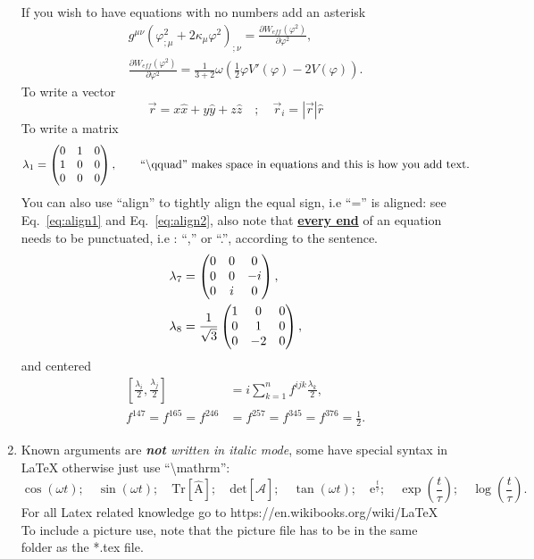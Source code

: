 \documentclass[11pt,fleqn]{article}
\newcommand{\eexp}{\mbox{e}^}
\newcommand{\amatrix}[1]{\begin{matrix} #1 \end{matrix}}
\begin{document}
\begin{enumerate}
If you wish to have equations with no numbers add an asterisk
\begin{eqnarray*}
&& g^{\mu \nu} \left( \varphi^2_{;\mu} + 2 \kappa_\mu \varphi^2\right)_{;\nu} = \frac{\partial W_{eff}(\varphi^2)}{\partial \varphi^2}, \\
&& \frac{\partial W_{eff}(\varphi^2)}{\partial \varphi^2} = \frac{1}{3+ 2} \omega \left(\frac{1}{2} \varphi V'(\varphi) - 2V(\varphi)\right).
\end{eqnarray*}
To write a vector
\begin{equation}
\vec{r} = x \hat{x} + y \hat{y} + z\hat{z} \quad ; \quad \vec{r}_i
= \left|\vec{r}\right|\hat{r} \end{equation}
To write a matrix
\begin{equation}
\lambda_1 
= \left( \amatrix { 0 & 1 & 0 \cr 1 & 0 & 0 \cr 0 & 0 & 0}\right), \text{\qquad ``\textbackslash qquad'' makes space in equations and this is how you add text.}
\end{equation}
You can also use ``align'' to tightly align the equal sign, i.e ``='' is aligned: see Eq.~\eqref{eq:align1} and Eq.~\eqref{eq:align2},  also note that {\underline{\bf every end}} of an  equation needs to be punctuated, i.e : ``,'' or ``.'', according to the sentence. 
\begin{align}
\lambda_7 
&= \left( \amatrix { 0 & 0 & 0 \cr 0 & 0 & -i \cr 0 & i & 0}\right), \label{eq:align1}\\
 \lambda_8 
&= \frac{1}{\sqrt{3}}\left( \amatrix { 1 & 0 & 0 \cr 0 & 1 & 0 \cr 0 & -2 & 0}\right),\label{eq:align2}
\end{align}
and centered
\begin{align*}
&&\left[\frac{\lambda_i}{2},\frac{\lambda_j}{2}\right] &= i \displaystyle\sum_{k=1}^{n} f^{ijk}\frac{\lambda_k}{2}, \\
&&f^{147}=f^{165}=f^{246}&=f^{257}=f^{345}=f^{376}= \frac{1}{2}.
\end{align*}

\item Known arguments are \textit{{\bf not} written in  italic mode}, some have special syntax in LaTeX otherwise just  use ``\textbackslash mathrm'': 
\begin{equation}
\cos (\omega t); \quad  \sin (\omega t);\quad  \mathrm{Tr \left[ \hat A\right] };\quad  \mathrm{det \left[ \hat {\mathcal{A}} \right] }; \quad \tan(\omega t); \quad  \eexp{\frac{t}{\tau}};\quad  \exp{\left(\frac{t}{\tau}\right)}; \quad \log\left(\frac{t}{\tau}\right).
\end{equation}For all Latex related knowledge go to https://en.wikibooks.org/wiki/LaTeX\\
To include a picture use, note that the picture file has to be in the same folder as the *.tex file.

\end{enumerate}

\end{document}
